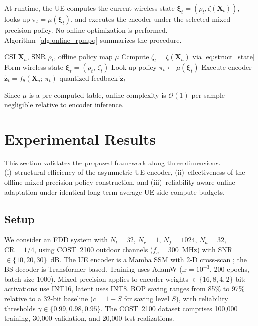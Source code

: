 \documentclass[conference]{IEEEtran}
\begin{document}
At runtime, the UE computes the current wireless state $\boldsymbol{\xi}_t=(\rho_t,\zeta(\mathbf{X}_t))$, looks up $\pi_t=\mu(\boldsymbol{\xi}_t)$, and executes the encoder under the selected mixed-precision policy.
No online optimization is performed.
Algorithm~\ref{alg:online_rpmpq} summarizes the procedure.

\begin{algorithm}[t]
\caption{RP-MPQ: Online Policy Deployment}
\label{alg:online_rpmpq}
\begin{algorithmic}[1]
\REQUIRE CSI $\mathbf{X}_a$, SNR $\rho_t$, offline policy map $\mu$
\STATE Compute $\zeta_t = \zeta(\mathbf{X}_a)$ via \eqref{eq:struct_state}
\STATE Form wireless state $\boldsymbol{\xi}_t = (\rho_t,\, \zeta_t)$
\STATE Look up policy $\pi_t \leftarrow \mu(\boldsymbol{\xi}_t)$
\STATE Execute encoder $\tilde{\mathbf{z}}_t = f_\theta(\mathbf{X}_a;\, \pi_t)$
\RETURN quantized feedback $\tilde{\mathbf{z}}_t$
\end{algorithmic}
\end{algorithm}

\noindent
Since $\mu$ is a pre-computed table, online complexity is $\mathcal{O}(1)$ per sample---negligible relative to encoder inference.

\section{Experimental Results}
\label{sec:experiments}

This section validates the proposed framework along three dimensions: (i)~structural efficiency of the asymmetric UE encoder, (ii)~effectiveness of the offline mixed-precision policy construction, and (iii)~reliability-aware online adaptation under identical long-term average UE-side compute budgets.

\subsection{Setup}
\label{subsec:exp_setup}

We consider an FDD system with $N_t=32$, $N_r=1$, $N_f=1024$, $N_a=32$, $\mathrm{CR}=1/4$, using COST~2100 outdoor channels \cite{COST2100} ($f_c=300$~MHz) with SNR $\in\{10,20,30\}$~dB.
The UE encoder is a Mamba SSM with 2-D cross-scan \cite{Mamba,VMamba}; the BS decoder is Transformer-based.
Training uses AdamW ($\mathrm{lr}=10^{-3}$, 200 epochs, batch size 1000).
Mixed precision applies to encoder weights $\in\{16,8,4,2\}$-bit; activations use INT16, latent uses INT8.
BOP saving ranges from 85\% to 97\% relative to a 32-bit baseline ($\bar{c}=1-S$ for saving level $S$), with reliability thresholds $\gamma\in\{0.99,0.98,0.95\}$.
The COST~2100 dataset comprises 100{,}000 training, 30{,}000 validation, and 20{,}000 test realizations.
\end{document}

